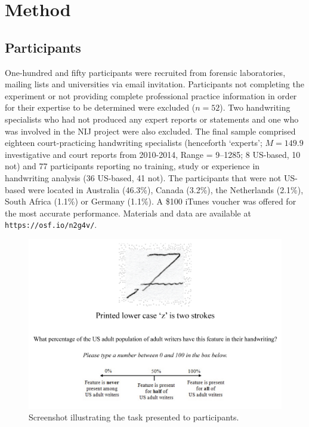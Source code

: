 \documentclass[doc]{apa6} %
\begin{document}
\section{Method}

\subsection{Participants}

One-hundred and fifty participants were recruited from forensic laboratories, mailing lists and universities via email invitation. Participants not completing the experiment or not providing complete professional practice information in order for their expertise to be determined were excluded ($n = 52$). Two handwriting specialists who had not produced any expert reports or statements and one who was involved in the NIJ project were also excluded. The final sample comprised eighteen court-practicing handwriting specialists (henceforth `experts'; $M = 149.9$ investigative and court reports from 2010-2014, Range = 9--1285; 8 US-based, 10 not) and 77 participants reporting no training, study or experience in handwriting analysis (36 US-based, 41 not). The participants that were not US-based were located in Australia (46.3\%), Canada (3.2\%), the Netherlands (2.1\%), South Africa (1.1\%) or Germany (1.1\%). A \$100 iTunes voucher was offered for the most accurate performance. Materials and data are available at \verb#https://osf.io/n2g4v/#.

\begin{figure}[p]
\begin{center}
\includegraphics[scale=.3]{taskfigure2.jpg}
\caption{Screenshot illustrating the task presented to participants.}
\label{screenshot}
\end{center}
\end{figure}
\end{document}
